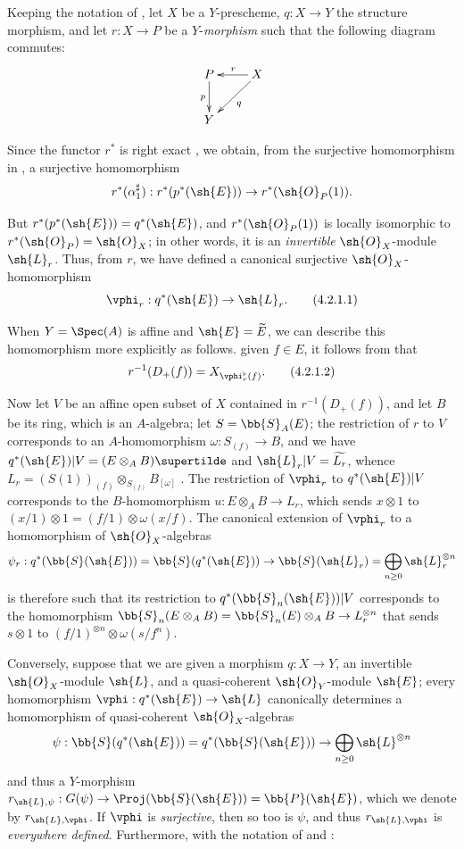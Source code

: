 \begin{env}[4.2.1]
\label{II.4.2.1}
Keeping the notation of , let $X$ be a $Y$-prescheme, $q:X\to Y$ the structure morphism, and let $r:X\to P$ be a $Y$-\emph{morphism} such that the following diagram commutes:
\[
  \xymatrix{
    P \ar[d]_p & X \ar[l]_r \ar[dl]^q
  \\Y
  }
\]

Since the functor $r^*$ is right exact , we obtain, from the surjective homomorphism in , a surjective homomorphism
\[
  r^*(\alpha_1^\sharp): r^*(p^*(\sh{E})) \to r^*(\sh{O}_P(1)).
\]

But $r^*(p^*(\sh{E}))=q^*(\sh{E})$, and $r^*(\sh{O}_P(1))$ is locally isomorphic to $r^*(\sh{O}_P)=\sh{O}_X$; in other words, it is an \emph{invertible} $\sh{O}_X$-module $\sh{L}_r$. Thus, from $r$, we have defined a canonical surjective $\sh{O}_X$-homomorphism
\[
\label{II.4.2.1.1}
  \vphi_r:q^*(\sh{E}) \to \sh{L}_r.
  \tag{4.2.1.1}
\]

When $Y=\Spec(A)$ is affine and $\sh{E}=\widetilde{E}$, we can describe this homomorphism more explicitly as follows.
given $f\in E$, it follows from  that
\[
\label{II.4.2.1.2}
  r^{-1}(D_+(f)) = X_{\vphi_r^\flat(f)}.
  \tag{4.2.1.2}
\]

Now let $V$ be an affine open subset of $X$ contained in $r^{-1}(D_+(f))$, and let $B$ be its ring, which is an $A$-algebra;
let $S=\bb{S}_A(E)$;
the restriction of $r$ to $V$ corresponds to an $A$-homomorphism $\omega:S_{(f)}\to B$, and we have $q^*(\sh{E})|V = (E\otimes_A B)\supertilde$ and $\sh{L}_r|V = \widetilde{L_r}$, whence $L_r = (S(1))_{(f)}\otimes_{S_{(f)}}B_{[\omega]}$ .
The restriction of $\vphi_r$ to $q^*(\sh{E})|V$ corresponds to the $B$-homomorphism $u:E\otimes_A B\to L_r$, which sends $x\otimes1$ to $(x/1)\otimes1 = (f/1)\otimes\omega(x/f)$.
The canonical extension of $\vphi_r$ to a homomorphism of $\sh{O}_X$-algebras
\[
  \psi_r: q^*(\bb{S}(\sh{E})) = \bb{S}(q^*(\sh{E})) \to \bb{S}(\sh{L}_r) = \bigoplus_{n\geq0}\sh{L}_r^{\otimes n}
\]
is therefore such that its restriction to $q^*(\bb{S}_n(\sh{E}))|V$ corresponds to the homomorphism $\bb{S}_n(E\otimes_A B) = \bb{S}_n(E)\otimes_A B \to L_r^{\otimes n}$ that sends $s\otimes1$ to $(f/1)^{\otimes n}\otimes\omega(s/f^n)$.
\end{env}

\begin{env}[4.2.2]
\label{II.4.2.2}
Conversely, suppose that we are given a morphism $q:X\to Y$, an invertible $\sh{O}_X$-module $\sh{L}$, and a quasi-coherent $\sh{O}_Y$-module $\sh{E}$;
every homomorphism $\vphi:q^*(\sh{E})\to\sh{L}$ canonically determines a homomorphism of quasi-coherent $\sh{O}_X$-algebras
\[
  \psi: \bb{S}(q^*(\sh{E})) = q^*(\bb{S}(\sh{E})) \to \bigoplus_{n\geq0}\sh{L}^{\otimes n}
\]
and thus  a $Y$-morphism $r_{\sh{L},\psi}:G(\psi)\to\Proj(\bb{S}(\sh{E}))=\bb{P}(\sh{E})$, which we denote by $r_{\sh{L},\vphi}$.
If $\vphi$ is \emph{surjective}, then so too is $\psi$, and thus  $r_{\sh{L},\vphi}$ is \emph{everywhere defined}.
Furthermore, with the notation of  and :
\end{env}

